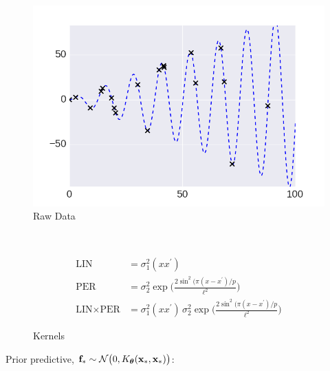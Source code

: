  \centering

     \begin{subfigure}[b]{0.45\textwidth}
        \includegraphics[width=\textwidth]{figs/composition/composition_demo_raw_data.png}
        \caption{Raw Data}
    \end{subfigure}
    ~ %
    \begin{subfigure}[b]{0.45\textwidth}
\small
     \begin{align*}
    \text{LIN} &=   \sigma_1^2(x x^\prime)\\
    \text{PER} &=  \sigma_2^2 \exp \bigg( \frac{2 \sin^2 ( \pi (x - x^\prime)/p}{\ell^2} \bigg)\\ 
    \text{LIN} \times \text{PER} &=  \sigma_1^2(x x^\prime)\, \sigma_2^2 \exp \bigg( \frac{2 \sin^2 ( \pi (x - x^\prime)/p}{\ell^2} \bigg) 
    \end{align*}\vspace{5mm} 
        \caption{Kernels}
    \end{subfigure}\vspace{4mm} 




Prior predictive, $\mathbf{f}_* \sim \mathcal{N}\big(0,K_{\bm{\theta}}(\mathbf{x}_*,\mathbf{x}_*)\big)$:

